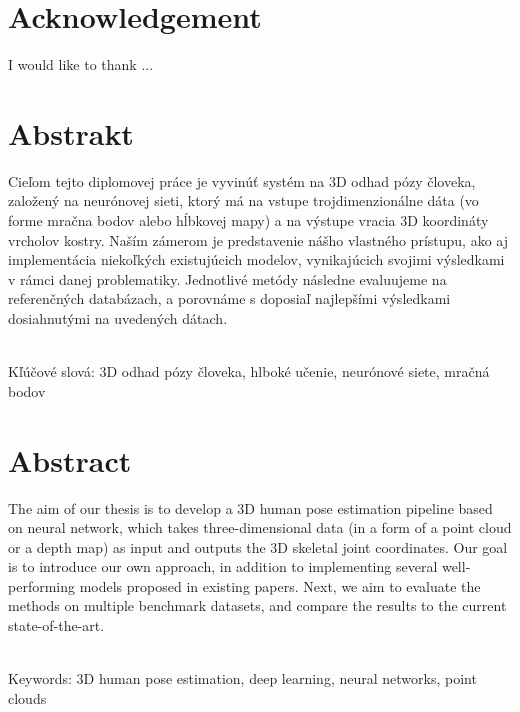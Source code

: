 \documentclass[12pt, a4paper, oneside]{book}
\begin{document}
\chapter*{Acknowledgement}\label{chap:thank_you}
I would like to thank ...

\chapter*{Abstrakt}\label{chap:abstract_sk}
Cieľom tejto diplomovej práce je vyvinúť systém na 3D odhad pózy človeka, založený na neurónovej sieti, ktorý má na vstupe trojdimenzionálne dáta (vo forme mračna bodov alebo hĺbkovej mapy) a na výstupe vracia 3D koordináty vrcholov kostry. Naším zámerom je predstavenie nášho vlastného prístupu, ako aj implementácia niekoľkých existujúcich modelov, vynikajúcich svojimi výsledkami v rámci danej problematiky. Jednotlivé metódy následne evaluujeme na referenčných databázach, a porovnáme s doposiaľ najlepšími výsledkami dosiahnutými na uvedených dátach.

~\\
Kľúčové slová: 3D odhad pózy človeka, hlboké učenie, neurónové siete, mračná bodov
\vfill\eject 

\chapter*{Abstract}\label{chap:abstract_en}
The aim of our thesis is to develop a 3D human pose estimation pipeline based on neural network, which takes three-dimensional data (in a form of a point cloud or a depth map) as input and outputs the 3D skeletal joint coordinates. Our goal is to introduce our own approach, in addition to implementing several well-performing models proposed in existing papers. Next, we aim to evaluate the methods on multiple benchmark datasets, and compare the results to the current state-of-the-art.

~\\
Keywords: 3D human pose estimation, deep learning, neural networks, point clouds
\vfill\eject 


\tableofcontents

\listoftables
\listoffigures

\mainmatter










\backmatter

\nocite{*}


\end{document}
